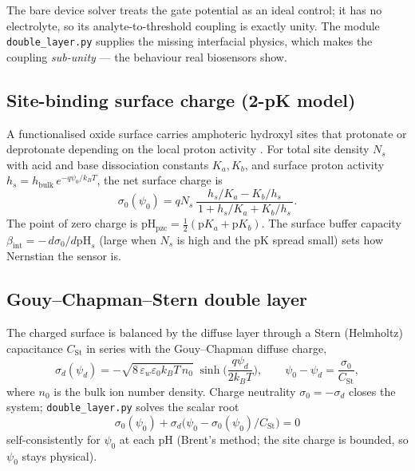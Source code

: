 \documentclass[11pt,a4paper]{article}
\newcommand{\code}[1]{\texttt{#1}}
\begin{document}
The bare device solver treats the gate potential as an ideal control; it has no
electrolyte, so its analyte-to-threshold coupling is exactly unity. The module
\code{double\_layer.py} supplies the missing interfacial physics, which makes the
coupling \emph{sub-unity} --- the behaviour real biosensors show.

\subsection{Site-binding surface charge (2-pK model)}
A functionalised oxide surface carries amphoteric hydroxyl sites that protonate
or deprotonate depending on the local proton activity
\cite{yates1974,fung1986,vanhal1996}. For total site density $N_s$ with acid and
base dissociation constants $K_a,K_b$, and surface proton activity
$h_s=h_{\mathrm{bulk}}\,e^{-q\psi_0/k_BT}$, the net surface charge is
\begin{equation}
  \sigma_0(\psi_0) = q N_s\,
  \frac{\,h_s/K_a - K_b/h_s\,}{\,1 + h_s/K_a + K_b/h_s\,}.
  \label{eq:sitecharge}
\end{equation}
The point of zero charge is $\mathrm{pH_{pzc}}=\tfrac12(\mathrm{p}K_a+\mathrm{p}K_b)$.
The surface buffer capacity $\beta_{\mathrm{int}}=-\,d\sigma_0/d\mathrm{pH}_s$
(large when $N_s$ is high and the pK spread small) sets how Nernstian the sensor is.

\subsection{Gouy--Chapman--Stern double layer}
The charged surface is balanced by the diffuse layer through a Stern (Helmholtz)
capacitance $C_{\mathrm{St}}$ in series with the Gouy--Chapman diffuse charge,
\begin{equation}
  \sigma_d(\psi_d) = -\sqrt{8\,\varepsilon_w\varepsilon_0 k_B T\,n_0}\;
  \sinh\!\Big(\frac{q\psi_d}{2k_BT}\Big),
  \qquad
  \psi_0 - \psi_d = \frac{\sigma_0}{C_{\mathrm{St}}},
  \label{eq:gc}
\end{equation}
where $n_0$ is the bulk ion number density. Charge neutrality
$\sigma_0=-\sigma_d$ closes the system; \code{double\_layer.py} solves the scalar
root
\begin{equation}
  \sigma_0(\psi_0) + \sigma_d\!\big(\psi_0 - \sigma_0(\psi_0)/C_{\mathrm{St}}\big)=0
  \label{eq:root}
\end{equation}
self-consistently for $\psi_0$ at each pH (Brent's method; the site charge is
bounded, so $\psi_0$ stays physical).
\end{document}

